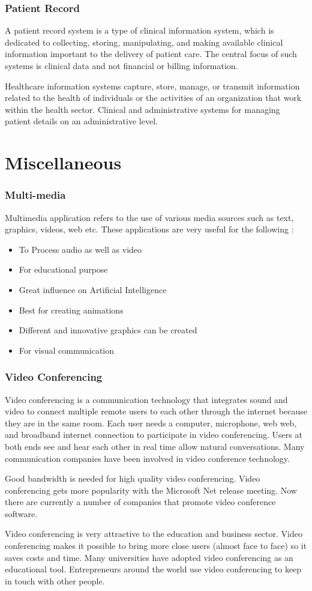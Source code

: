 \documentclass[11pt,a4paper,twoside]{article}
\begin{document}
\section{Patient Record}
A patient record system is a type of clinical information system, which is dedicated to collecting, storing, manipulating, and making available clinical information important to the delivery of patient care. The central focus of such systems is clinical data and not financial or billing information.\par
Healthcare information systems capture, store, manage, or transmit information related to the health of individuals or the activities of an organization that work within the health sector. Clinical and administrative systems for managing patient details on an administrative level.
\newpage
\part{Miscellaneous}
\section{Multi-media}
Multimedia application refers to the use of various media sources such as text, graphics, videos, web etc. These applications are very useful for the following :
\begin{itemize}
    \item To Process audio as well as video
\item For educational purpose
\item Great influence on Artificial Intelligence
\item Best for creating animations
\item Different and innovative graphics can be created
\item For visual communication
\end{itemize}
\section{Video Conferencing}
Video conferencing is a communication technology that integrates sound and video to connect multiple remote users to each other through the internet because they are in the same room. Each user needs a computer, microphone, web web, and broadband internet connection to participate in video conferencing. Users at both ends see and hear each other in real time allow natural conversations. Many communication companies have been involved in video conference technology.\par
Good bandwidth is needed for high quality video conferencing. Video conferencing gets more popularity with the Microsoft Net release meeting. Now there are currently a number of companies that promote video conference software.\par
Video conferencing is very attractive to the education and business sector. Video conferencing makes it possible to bring more close users (almost face to face) so it saves costs and time. Many universities have adopted video conferencing as an educational tool. Entrepreneurs around the world use video conferencing to keep in touch with other people.
\end{document}
